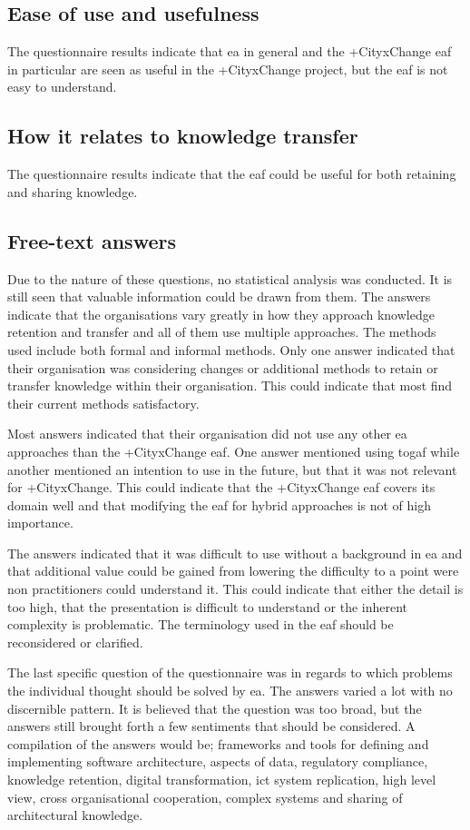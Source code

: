 \subsection{Ease of use and usefulness}
The questionnaire results indicate that \gls{ea} in general and the +CityxChange \gls{eaf} in particular are seen as useful in the +CityxChange project, but the \gls{eaf} is not easy to understand. 

\subsection{How it relates to knowledge transfer}
The questionnaire results indicate that the \gls{eaf} could be useful for both retaining and sharing knowledge.

\subsection{Free-text answers}
Due to the nature of these questions, no statistical analysis was conducted. It is still seen that valuable information could be drawn from them. The answers indicate that the organisations vary greatly in how they approach knowledge retention and transfer and all of them use multiple approaches. The methods used include both formal and informal methods. Only one answer indicated that their organisation was considering changes or additional methods to retain or transfer knowledge within their organisation. This could indicate that most find their current methods satisfactory. 

Most answers indicated that their organisation did not use any other \gls{ea} approaches than the +CityxChange \gls{eaf}. One answer mentioned using \gls{togaf} while another mentioned an intention to use in the future, but that it was not relevant for +CityxChange. This could indicate that the +CityxChange \gls{eaf} covers its domain well and that modifying the \gls{eaf} for hybrid approaches is not of high importance.

The answers indicated that it was difficult to use without a background in \gls{ea} and that additional value could be gained from lowering the difficulty to a point were non practitioners could understand it. This could indicate that either the detail is too high, that the presentation is difficult to understand or the inherent complexity is problematic. The terminology used in the \gls{eaf} should be reconsidered or clarified.

The last specific question of the questionnaire was in regards to which problems the individual thought should be solved by \gls{ea}. The answers varied a lot with no discernible pattern. It is believed that the question was too broad, but the answers still brought forth a few sentiments that should be considered. A compilation of the answers would be; frameworks and tools for defining and implementing software architecture, aspects of data, regulatory compliance, knowledge retention, digital transformation, \gls{ict} system replication, high level view, cross organisational cooperation, complex systems and sharing of architectural knowledge.

